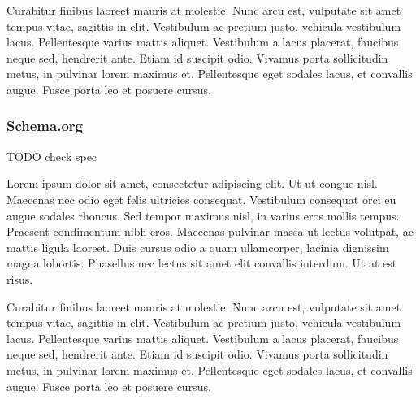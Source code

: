 Curabitur finibus laoreet mauris at molestie. Nunc arcu est, vulputate sit amet tempus vitae, sagittis in elit. Vestibulum ac pretium justo, vehicula vestibulum lacus. Pellentesque varius mattis aliquet. Vestibulum a lacus placerat, faucibus neque sed, hendrerit ante. Etiam id suscipit odio. Vivamus porta sollicitudin metus, in pulvinar lorem maximus et. Pellentesque eget sodales lacus, et convallis augue. Fusce porta leo et posuere cursus.

\subsubsection{Schema.org}

TODO check spec

Lorem ipsum dolor sit amet, consectetur adipiscing elit. Ut ut congue nisl. Maecenas nec odio eget felis ultricies consequat. Vestibulum consequat orci eu augue sodales rhoncus. Sed tempor maximus nisl, in varius eros mollis tempus. Praesent condimentum nibh eros. Maecenas pulvinar massa ut lectus volutpat, ac mattis ligula laoreet. Duis cursus odio a quam ullamcorper, lacinia dignissim magna lobortis. Phasellus nec lectus sit amet elit convallis interdum. Ut at est risus.

Curabitur finibus laoreet mauris at molestie. Nunc arcu est, vulputate sit amet tempus vitae, sagittis in elit. Vestibulum ac pretium justo, vehicula vestibulum lacus. Pellentesque varius mattis aliquet. Vestibulum a lacus placerat, faucibus neque sed, hendrerit ante. Etiam id suscipit odio. Vivamus porta sollicitudin metus, in pulvinar lorem maximus et. Pellentesque eget sodales lacus, et convallis augue. Fusce porta leo et posuere cursus.
